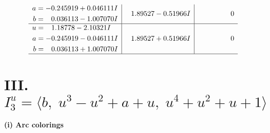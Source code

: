 \documentclass[1p]{elsarticle_modified}
\theoremstyle{definition}
\begin{document}
$$\begin{array}{c|c|c}
\begin{aligned}
a &= -0.245919 + 0.046111 I \\
b &= \phantom{-}0.036113 - 1.007070 I\end{aligned}
 & \phantom{-}1.89527 - 0.51966 I & \phantom{-0.000000 } 0 \\ \hline\begin{aligned}
u &= \phantom{-}1.18778 - 2.10321 I \\
a &= -0.245919 - 0.046111 I \\
b &= \phantom{-}0.036113 + 1.007070 I\end{aligned}
 & \phantom{-}1.89527 + 0.51966 I & \phantom{-0.000000 } 0\\
 \hline 
 \end{array}$$\newpage\newpage\renewcommand{\arraystretch}{1}
\centering \section*{III. $I^u_{3}= \langle b,\;u^3- u^2+a+u,\;u^4+u^2+u+1 \rangle$}
\flushleft \textbf{(i) Arc colorings}\\
\end{document}
